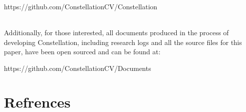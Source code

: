 \documentclass[preprint,12pt]{elsarticle}
\begin{document}
\begin{centering}
\textsf{https://github.com/ConstellationCV/Constellation}\\~\\
\end{centering}

Additionally, for those interested, all documents produced in the process of developing Constellation, including research logs and all the source files for this paper, have been open sourced and can be found at:\\

\begin{centering}
\textsf{https://github.com/ConstellationCV/Documents}\\
\end{centering}
\pagebreak

\tocless\section{Refrences}
\label{A:2}











\restoregeometry
\end{document}

